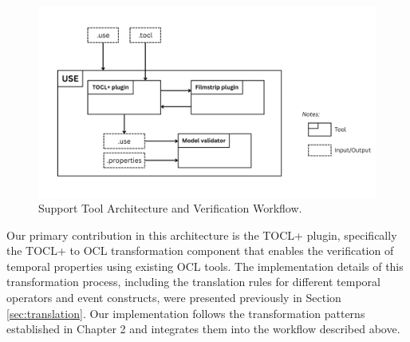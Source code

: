 \begin{figure}[H]
    \centering
    \includegraphics[width=1\textwidth]{figures/c3/Architecture_overview.png}
    \caption{Support Tool Architecture and Verification Workflow.}
    \label{sec:plugin_support_tool_architecture}
\end{figure}

Our primary contribution in this architecture is the TOCL+ plugin, specifically 
the TOCL+ to OCL transformation component that enables the verification of temporal 
properties using existing OCL tools. The implementation details of this transformation 
process, including the translation rules for different temporal operators and event 
constructs, were presented previously in Section \ref{sec:translation}. Our implementation 
follows the transformation patterns established in Chapter 2 and integrates them into 
the workflow described above.





